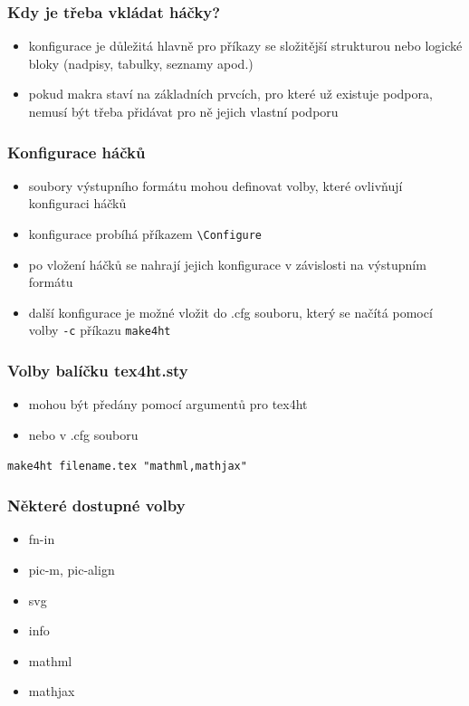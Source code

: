 \begin{frame}
  \frametitle{Kdy je třeba vkládat háčky?}
  \begin{itemize}
\item konfigurace je důležitá hlavně pro příkazy se složitější strukturou nebo
      logické bloky (nadpisy, tabulky, seznamy apod.)
    \item  pokud makra staví na základních prvcích, pro které už existuje
      podpora, nemusí být třeba přidávat pro ně jejich vlastní podporu
  \end{itemize}
\end{frame}

\begin{frame}
  \frametitle{Konfigurace háčků}
  \begin{itemize}
    \item soubory výstupního formátu mohou definovat volby, které ovlivňují konfiguraci háčků
    \item konfigurace probíhá příkazem \texttt{\textbackslash Configure}

    \item po vložení háčků se nahrají jejich konfigurace v závislosti na
      výstupním formátu
    \item další konfigurace je možné vložit do .cfg souboru, který se načítá pomocí volby \texttt{-c} příkazu \texttt{make4ht}

\end{itemize}
\end{frame}

\begin{frame}[fragile]
  \frametitle{Volby balíčku tex4ht.sty}
  \begin{itemize}
    \item mohou být předány pomocí argumentů pro tex4ht
    \item nebo v .cfg souboru
  \end{itemize}
  \begin{priklad}
\begin{verbatim}
make4ht filename.tex "mathml,mathjax"
\end{verbatim}
\end{priklad}
\end{frame}

\begin{frame}
  \frametitle{Některé dostupné volby}
\begin{itemize}
  \item fn-in
  \item pic-m, pic-align
  \item svg
  \item info
  \item mathml
  \item mathjax
\end{itemize}
\end{frame}


